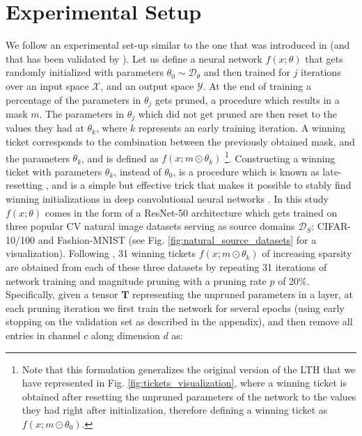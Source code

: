 \section{Experimental Setup}
\label{sec:experimental_setup}
We follow an experimental set-up similar to the one that was introduced in \cite{morcos2019one} (and that has been validated by \citet{gohil2019one}).
Let us define a neural network $f(x;\theta)$ that gets randomly initialized with parameters $\theta_0 \sim \mathcal{D}_{\theta}$ and then trained for $j$ iterations
over an input space $\mathcal{X}$, and an output space $\mathcal{Y}$. 
At the end of training a percentage of the parameters in $\theta_j$ gets pruned, a procedure which results in a mask $m$. The parameters in $\theta_j$ which did not get pruned are then reset to the values they had at $\theta_k$, where $k$ represents an early training iteration. A winning ticket corresponds to the combination between the previously obtained mask, and the parameters $\theta_k$, and is defined as $f(x;m\odot\theta_k)$ \footnote{Note that this formulation generalizes the original version of the LTH \cite{frankle2018lottery} that we have represented in Fig. \ref{fig:tickets_visualization}, where a winning ticket is obtained after resetting the unpruned parameters of the network to the values they had right after initialization, therefore defining a winning ticket as $f(x;m\odot\theta_0)$.}. Constructing a winning ticket with parameters $\theta_k$, instead of $\theta_0$, is a procedure which is known as late-resetting \cite{franklestabilizing}, and is a simple but effective trick that makes it possible to stably find winning initializations in deep convolutional neural networks \cite{franklestabilizing,morcos2019one}. In this study $f(x;\theta)$ comes in the form of a ResNet-50 architecture \cite{han2015deep} which gets trained on three popular CV natural image datasets serving as source domains $\mathcal{D}_S$: CIFAR-10/100 and Fashion-MNIST (see Fig. \ref{fig:natural_source_datasets} for a visualization). Following \cite{han2015deep,morcos2019one}, 31 winning tickets $f(x;m\odot\theta_k)$ of increasing sparsity are obtained from each of these three datasets by repeating 31 iterations of network training and magnitude pruning with a pruning rate $p$ of 20\%. Specifically, given a tensor $\mathbf{T}$ representing the unpruned parameters in a layer, at each pruning iteration we first train the network for several epochs (using early stopping on the validation set as described in the appendix), and then remove all entries in channel $c$ along dimension $d$ as:
